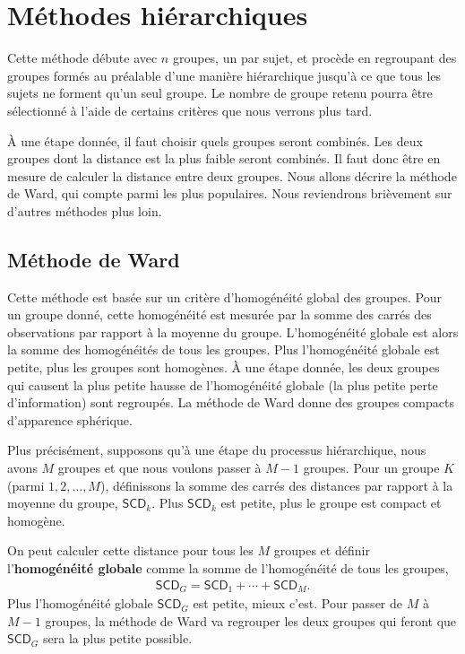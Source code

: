 \documentclass[
  11pt,
  letterpaper,
]{book}
\theoremstyle{definition}
\theoremstyle{definition}
\theoremstyle{definition}
\theoremstyle{remark}
\begin{document}
\hypertarget{muxe9thodes-hiuxe9rarchiques}{%
\section{Méthodes hiérarchiques}\label{muxe9thodes-hiuxe9rarchiques}}

Cette méthode débute avec \(n\) groupes, un par sujet, et procède en regroupant des groupes formés au préalable d'une manière hiérarchique jusqu'à ce que tous les sujets ne forment qu'un seul groupe. Le nombre de groupe retenu pourra être sélectionné à l'aide de certains critères que nous verrons plus tard.

À une étape donnée, il faut choisir quels groupes seront combinés. Les deux groupes dont la distance est la plus faible seront combinés. Il faut donc être en mesure de calculer la distance entre deux groupes. Nous allons décrire la méthode de Ward, qui compte parmi les plus populaires. Nous reviendrons brièvement sur d'autres méthodes plus loin.

\hypertarget{muxe9thode-de-ward}{%
\subsection{Méthode de Ward}\label{muxe9thode-de-ward}}

Cette méthode est basée sur un critère d'homogénéité global des groupes. Pour un groupe donné, cette homogénéité est mesurée par la somme des carrés des observations par rapport à la moyenne du groupe. L'homogénéité globale est alors la somme des homogénéités de tous les groupes. Plus l'homogénéité globale est petite, plus les groupes sont homogènes. À une étape donnée, les deux groupes qui causent la plus petite hausse de l'homogénéité globale (la plus petite perte d'information) sont regroupés. La méthode de Ward donne des groupes compacts d'apparence sphérique.

Plus précisément, supposons qu'à une étape du processus hiérarchique, nous avons \(M\) groupes et que nous voulons passer à \(M-1\) groupes. Pour un groupe \(K\) (parmi \(1, 2, \ldots, M\)), définissons la somme des carrés des distances par rapport à la moyenne du groupe, \(\mathsf{SCD}_k\). Plus \(\mathsf{SCD}_k\) est petite, plus le groupe est compact et homogène.

On peut calculer cette distance pour tous les \(M\) groupes et définir l'\textbf{homogénéité globale} comme la somme de l'homogénéité de tous les groupes,
\begin{align*}
\mathsf{SCD}_G = \mathsf{SCD}_1 + \cdots + \mathsf{SCD}_M.
\end{align*}
Plus l'homogénéité globale \(\mathsf{SCD}_G\) est petite, mieux c'est. Pour passer de \(M\) à \(M-1\) groupes, la méthode de Ward va regrouper les deux groupes qui feront que \(\mathsf{SCD}_G\) sera la plus petite possible.
\end{document}
